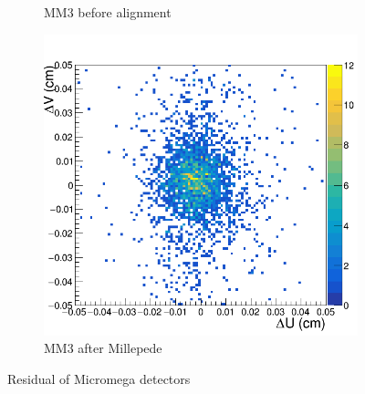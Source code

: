 \begin{figure}[h!]
\begin{subfigure}[l]{.45\textwidth}
   \caption{MM3 before alignment}
   \label{fig:MM3_before}
 \end{subfigure}
 \begin{subfigure}[r]{.45\textwidth}
   \centering
   \includegraphics[width=\linewidth]{thesis_figures/alignment/Run_3211_after_millepede/square/MX3.png}
   \caption{MM3 after Millepede}
   \label{fig:MX3_after}
 \end{subfigure}
 \caption{Residual of Micromega detectors}
  \label{fig:MX_residuals_1}
\end{figure}


